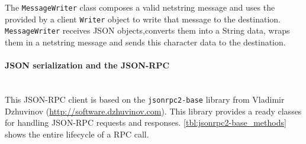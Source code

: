The \texttt{MessageWriter} class composes a valid netstring message and  uses the provided
by a client \texttt{Writer} object to write that message to the destination.
\texttt{MessageWriter} receives JSON  objects,converts them into a String data, wraps them
in a netstring message and sends this character data to the destination.

\paragraph{JSON serialization and the JSON-RPC} ~\\

This JSON-RPC client is based on the \texttt{jsonrpc2-base} library from
Vladimir Dzhuvinov (\url{http://software.dzhuvinov.com}).
This library provides a ready classes for handling JSON-RPC requests and
responses.
\autoref{tbl:jsonrpc2-base_methods} shows the entire lifecycle of a RPC call.



